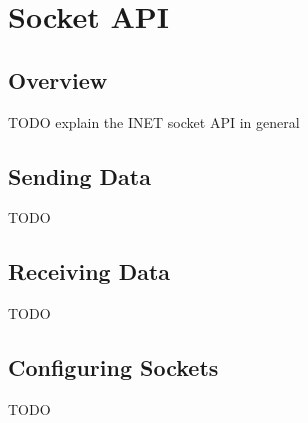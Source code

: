 \chapter{Socket API}
\label{cha:sockets}

\section{Overview}

TODO explain the INET socket API in general



\section{Sending Data}

TODO

\section{Receiving Data}

TODO

\section{Configuring Sockets}

TODO


